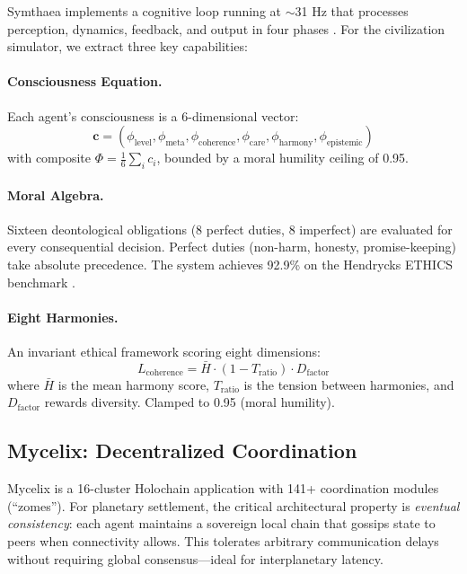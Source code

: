 \documentclass[12pt,a4paper]{article}
\begin{document}
Symthaea implements a cognitive loop running at $\sim$31 Hz that processes perception, dynamics, feedback, and output in four phases \citep{stoltz2026symthaea}. For the civilization simulator, we extract three key capabilities:

\paragraph{Consciousness Equation.} Each agent's consciousness is a 6-dimensional vector:
\begin{equation}
    \mathbf{c} = (\phi_\text{level}, \phi_\text{meta}, \phi_\text{coherence}, \phi_\text{care}, \phi_\text{harmony}, \phi_\text{epistemic})
\end{equation}
with composite $\Phi = \frac{1}{6}\sum_i c_i$, bounded by a moral humility ceiling of 0.95.

\paragraph{Moral Algebra.} Sixteen deontological obligations (8 perfect duties, 8 imperfect) are evaluated for every consequential decision. Perfect duties (non-harm, honesty, promise-keeping) take absolute precedence. The system achieves 92.9\% on the Hendrycks ETHICS benchmark \citep{hendrycks2021aligning}.

\paragraph{Eight Harmonies.} An invariant ethical framework scoring eight dimensions:
\begin{equation}
    L_\text{coherence} = \bar{H} \cdot (1 - T_\text{ratio}) \cdot D_\text{factor}
\end{equation}
where $\bar{H}$ is the mean harmony score, $T_\text{ratio}$ is the tension between harmonies, and $D_\text{factor}$ rewards diversity. Clamped to 0.95 (moral humility).

\subsection{Mycelix: Decentralized Coordination}

Mycelix is a 16-cluster Holochain application with 141+ coordination modules (``zomes''). For planetary settlement, the critical architectural property is \emph{eventual consistency}: each agent maintains a sovereign local chain that gossips state to peers when connectivity allows. This tolerates arbitrary communication delays without requiring global consensus---ideal for interplanetary latency.
\end{document}

